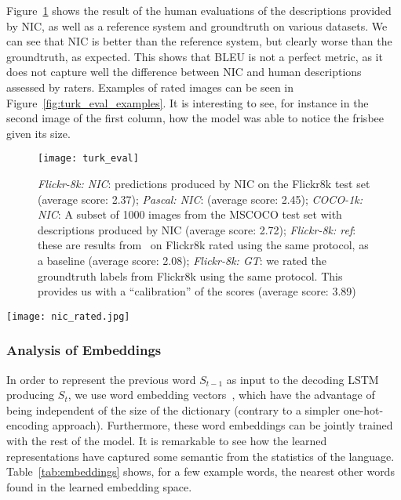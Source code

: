 Figure~\ref{fig:turk_eval_numeric} shows the result of the human evaluations
of the descriptions provided by NIC, as well as a reference system and
groundtruth on various datasets. We can see that NIC is better than the reference
system, but clearly worse than the groundtruth, as expected.
This shows that BLEU is not a perfect metric, as it does not capture well
the difference between NIC and human descriptions assessed by raters.
Examples of rated images can be seen in Figure~\ref{fig:turk_eval_examples}.
It is interesting to see, for instance in the second image of the first
column, how the model was able to notice the frisbee given its size.

\begin{figure}
\begin{center}
  \texttt{[image: turk\_eval]}
\end{center}
\vspace{-0.5cm}
\caption{\label{fig:turk_eval_numeric} {\em Flickr-8k: NIC}: predictions produced by NIC on the Flickr8k test set (average score: 2.37); {\em Pascal: NIC}: (average score: 2.45); {\em COCO-1k: NIC}: A subset of 1000 images from the MSCOCO test set with descriptions produced by NIC (average score: 2.72); {\em Flickr-8k: ref}: these are results from~\cite{hodosh2013framing} on Flickr8k rated using the same protocol, as a baseline (average score: 2.08); {\em Flickr-8k: GT}: we rated the groundtruth labels from Flickr8k using the same protocol. This provides us with a ``calibration'' of the scores (average score: 3.89)}
\end{figure}

\begin{figure*}
\begin{center}
  \texttt{[image: nic\_rated.jpg]}
\vspace{-1cm}
\end{center}
\caption{\label{fig:turk_eval_examples} A selection of evaluation results, grouped by human rating.}
\end{figure*}


\subsubsection{Analysis of Embeddings}

In order to represent the previous word $S_{t-1}$ as input to the decoding LSTM
producing $S_t$, we use word embedding vectors~\cite{mikolov2013},
which have the advantage of
being independent of the size of the dictionary (contrary to a simpler
one-hot-encoding approach).
Furthermore, these word embeddings can be jointly trained with the rest of the
model. It is remarkable to see how the learned representations
have captured some semantic from the statistics of the language.
Table~\ref{tab:embeddings} shows, for a few example words, the nearest other
words found in the learned embedding space.


